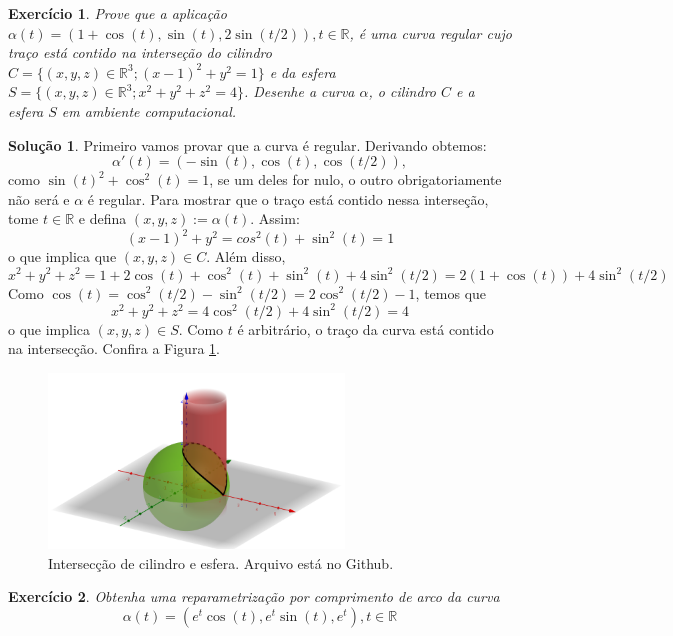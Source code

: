 \documentclass[a4paper,12pt]{article}
\newcommand{\R}{\mathbb{R}}
\theoremstyle{exer}
\newtheorem{exercise}{Exercício}
\theoremstyle{definition}
\newtheorem{solution}{Solução}
\theoremstyle{plain}
\begin{document}
\begin{exercise}
    Prove que a aplicação $\alpha(t) = (1 + \cos(t), \sin(t), 2\sin(t/2)), t
    \in \R$, é uma curva regular cujo traço está contido na interseção do
    cilindro $C = \{(x, y, z) \in \R^3; (x - 1)^2 + y^2 = 1\}$ e da esfera $S
    = \{(x, y, z) \in \R^3; x^2 + y^2 + z^2 = 4\}$. Desenhe a curva $\alpha$,
    o cilindro $C$ e a esfera $S$ em ambiente computacional.    
\end{exercise}

\begin{solution}
    Primeiro vamos provar que a curva é regular. Derivando obtemos:
    $$
    \alpha '(t) = (-\sin(t), \cos(t), \cos(t/2)),
    $$
    como $\sin(t)^2 + \cos^2(t) = 1$, se um deles for nulo, o outro
    obrigatoriamente não será e $\alpha$ é regular. Para mostrar que o traço
    está contido nessa interseção, tome $t \in \R$ e defina $(x,y,z) :=
    \alpha(t)$. Assim: 
    $$
    (x - 1)^2 + y^2 = cos^2(t) + \sin^2(t) = 1
    $$
    o que implica que $(x,y,z) \in C$. Além disso, 
    $$
    x^2 + y^2 + z^2 = 1 + 2\cos(t) + \cos^2(t) + \sin^2(t) + 4\sin^2(t/2) = 2(1 + \cos(t)) + 4\sin^2(t/2)
    $$
    Como $\cos(t) = \cos^2(t/2) - \sin^2(t/2) = 2\cos^2(t/2) - 1$, temos que 
    $$
    x^2 + y^2 + z^2 = 4\cos^2(t/2) + 4\sin^2(t/2) = 4
    $$
    o que implica $(x,y,z) \in S$. Como $t$ é arbitrário, o traço da curva
    está contido na intersecção. Confira a Figura \ref{fig-exer2}.

    \begin{figure}
        \centering
        \includegraphics[width=0.7\textwidth]{images/exer2.png}
        \caption{Intersecção de cilindro e esfera. Arquivo está no Github.}
        \label{fig-exer2}
    \end{figure}
\end{solution}

\begin{exercise}
    Obtenha uma reparametrização por comprimento de arco da curva
    $$\alpha(t) = (e^t\cos(t), e^t\sin(t), e^t), t \in \R$$
\end{exercise}
\end{document}
